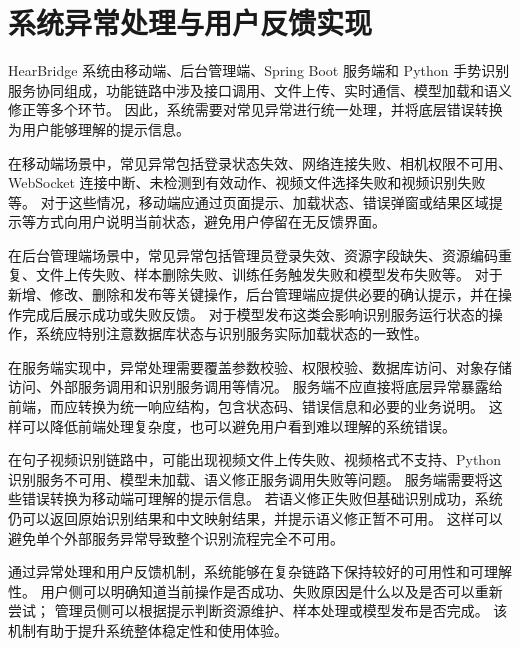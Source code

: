 
\section{系统异常处理与用户反馈实现}

HearBridge 系统由移动端、后台管理端、Spring Boot 服务端和 Python 手势识别服务协同组成，功能链路中涉及接口调用、文件上传、实时通信、模型加载和语义修正等多个环节。
因此，系统需要对常见异常进行统一处理，并将底层错误转换为用户能够理解的提示信息。

在移动端场景中，常见异常包括登录状态失效、网络连接失败、相机权限不可用、WebSocket 连接中断、未检测到有效动作、视频文件选择失败和视频识别失败等。
对于这些情况，移动端应通过页面提示、加载状态、错误弹窗或结果区域提示等方式向用户说明当前状态，避免用户停留在无反馈界面。

在后台管理端场景中，常见异常包括管理员登录失效、资源字段缺失、资源编码重复、文件上传失败、样本删除失败、训练任务触发失败和模型发布失败等。
对于新增、修改、删除和发布等关键操作，后台管理端应提供必要的确认提示，并在操作完成后展示成功或失败反馈。
对于模型发布这类会影响识别服务运行状态的操作，系统应特别注意数据库状态与识别服务实际加载状态的一致性。

在服务端实现中，异常处理需要覆盖参数校验、权限校验、数据库访问、对象存储访问、外部服务调用和识别服务调用等情况。
服务端不应直接将底层异常暴露给前端，而应转换为统一响应结构，包含状态码、错误信息和必要的业务说明。
这样可以降低前端处理复杂度，也可以避免用户看到难以理解的系统错误。

在句子视频识别链路中，可能出现视频文件上传失败、视频格式不支持、Python 识别服务不可用、模型未加载、语义修正服务调用失败等问题。
服务端需要将这些错误转换为移动端可理解的提示信息。
若语义修正失败但基础识别成功，系统仍可以返回原始识别结果和中文映射结果，并提示语义修正暂不可用。
这样可以避免单个外部服务异常导致整个识别流程完全不可用。

通过异常处理和用户反馈机制，系统能够在复杂链路下保持较好的可用性和可理解性。
用户侧可以明确知道当前操作是否成功、失败原因是什么以及是否可以重新尝试；
管理员侧可以根据提示判断资源维护、样本处理或模型发布是否完成。
该机制有助于提升系统整体稳定性和使用体验。
